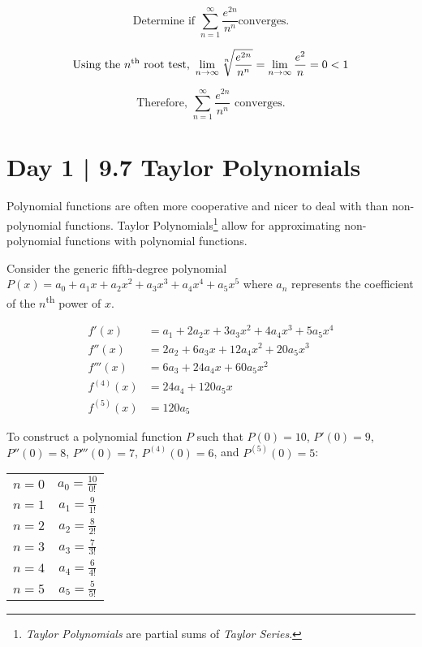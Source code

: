 \documentclass{article}
\theoremstyle{definition}
\begin{document}
\[\text{Determine if }\sum_{n=1}^{\infty} \frac{e^{2n}}{n^n}\text{converges.}\]


\[\text{Using the $n$\textsuperscript{th} root test, }\lim_{n \to \infty} \sqrt[n]{\frac{e^{2n}}{n^n}} = \lim_{n \to \infty} \frac{e^2}{n} = 0 < 1\]

\[\text{Therefore, }\sum_{n=1}^{\infty} \frac{e^{2n}}{n^n} \text{ converges.}\]

\newpage

\section{Day 1 | 9.7 Taylor Polynomials}

Polynomial functions are often more cooperative and nicer to deal with than non-polynomial functions. Taylor Polynomials\footnote{\textit{Taylor Polynomials} are partial sums of \textit{Taylor Series}.} allow for approximating non-polynomial functions with polynomial functions.

\vspace{0.5cm}

Consider the generic fifth-degree polynomial $P(x)=a_0 + a_1x + a_2x^2 + a_3x^3 + a_4x^4 + a_5x^5$ where $a_n$ represents the coefficient of the $n$\textsuperscript{th} power of $x$.

\begin{equation*}
\begin{split}
    f'(x)&= a_1 + 2a_2x + 3a_3x^2 + 4a_4x^3 + 5a_5x^4\\
    f''(x)&=2a_2 + 6a_3x + 12a_4x^2 + 20a_5x^3\\
    f'''(x)&=6a_3 + 24a_4x + 60a_5x^2\\
    f^{(4)}(x)&=24a_4 + 120a_5x\\
    f^{(5)}(x)&=120a_5
\end{split}
\end{equation*}

\vspace{0.5cm}
To construct a polynomial function $P$ such that $P(0)=10$, $P'(0)=9$, $P''(0)=8$, $P'''(0)=7$, $P^{(4)}(0)=6$, and $P^{(5)}(0)=5$:

\begin{center}
\begin{tabular}{c c}
$n=0$    &$a_0=\frac{10}{0!}$ \\
$n=1$    &$a_1=\frac{9}{1!}$ \\
$n=2$    &$a_2=\frac{8}{2!}$ \\
$n=3$    &$a_3=\frac{7}{3!}$ \\
$n=4$    &$a_4=\frac{6}{4!}$ \\
$n=5$    &$a_5=\frac{5}{5!}$ \\
\end{tabular}
\end{center}
\end{document}
